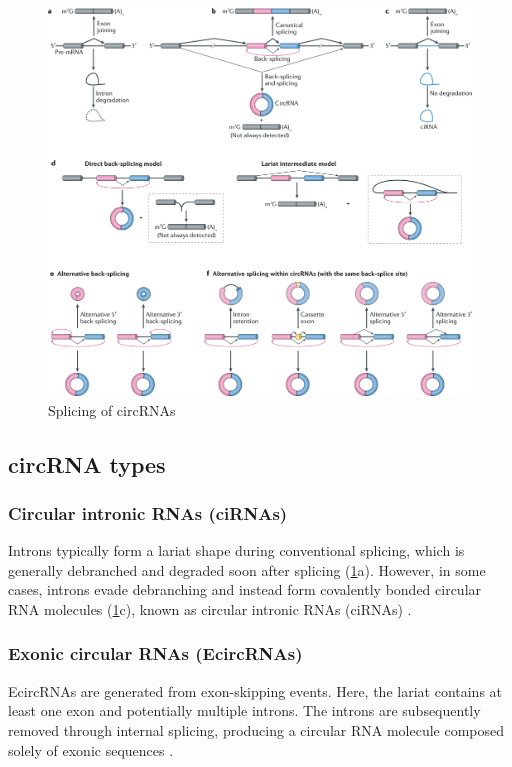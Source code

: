 \begin{figure}[ht]
    \centering
    \includegraphics[width=\textwidth]{chapters/background/figures/circRNA-splicing.png}
    \caption{Splicing of circRNAs} %
    \label{fig:circRNA_splicing}
\end{figure}

\subsection{circRNA types}
\subsubsection{Circular intronic RNAs (ciRNAs)}
Introns typically form a lariat shape during conventional splicing, which is
generally debranched and degraded soon after splicing
(\cref{fig:circRNA_splicing}a). However, in some cases, introns evade
debranching and instead form covalently bonded circular RNA molecules
(\cref{fig:circRNA_splicing}c), known as circular intronic RNAs (ciRNAs)
\supercite{chen_expanding_2020,zhang_circular_2013}.

\subsubsection{Exonic circular RNAs (EcircRNAs)}
EcircRNAs are generated from exon-skipping events. Here, the lariat contains at
least one exon and potentially multiple introns. The introns are subsequently
removed through internal splicing, producing a circular RNA molecule composed
solely of exonic sequences \supercite{xiao_circular_2022, li_biogenesis_2018}.

